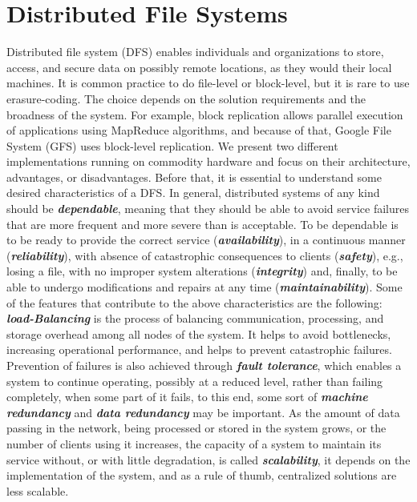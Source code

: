 \documentclass[runningheads]{llncs}
\begin{document}
\newpage\section{Distributed File Systems}\label{sec:distributed-file-systems}
Distributed file system (DFS) enables individuals and organizations to store, access, and secure data on possibly remote locations, as they would their local machines. It is common practice to do file-level or block-level, but it is rare to use erasure-coding. The choice depends on the solution requirements and the broadness of the system. For example, block replication allows parallel execution of applications using MapReduce algorithms, and because of that, Google File System\cite{gfs} (GFS) uses block-level replication. We present two different implementations running on commodity hardware and focus on their architecture, advantages, or disadvantages. Before that, it is essential to understand some desired characteristics of a DFS. In general, distributed systems of any kind should be \textbf{\textit{dependable}}, meaning that they should be able to avoid service failures that are more frequent and more severe than is acceptable. To be dependable is to be ready to provide the correct service (\textbf{\textit{availability}}), in a continuous manner (\textbf{\textit{reliability}}), with absence of catastrophic consequences to clients (\textbf{\textit{safety}}), e.g., losing a file, with no improper system alterations (\textbf{\textit{integrity}}) and, finally, to be able to undergo modifications and repairs at any time (\textbf{\textit{maintainability}}). Some of the features that contribute to the above characteristics are the following: \textbf{\textit{load-Balancing}} is the process of balancing communication, processing, and storage overhead among all nodes of the system. It helps to avoid bottlenecks, increasing operational performance, and helps to prevent catastrophic failures. Prevention of failures is also achieved through \textbf{\textit{fault tolerance}}, which enables a system to continue operating, possibly at a reduced level,  rather  than failing completely, when some part of it fails, to this end, some sort of \textbf{\textit{machine redundancy}} and \textbf{\textit{data redundancy}} may be important. As the amount of data passing in the network, being processed or stored in the system grows, or the number of clients using it increases, the capacity of a system to maintain its service without, or with little degradation, is called \textbf{\textit{scalability}}, it depends on the implementation of the system, and as a rule of thumb, centralized solutions are less scalable.
\end{document}
